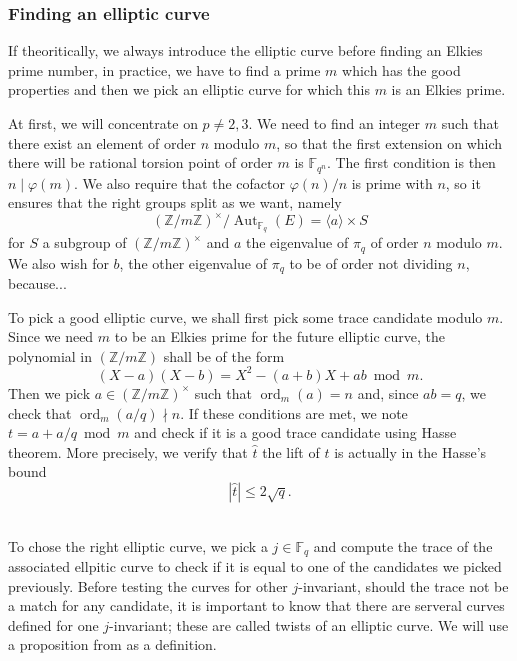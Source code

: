 \documentclass[12pt]{article}
\theoremstyle{plain}
\theoremstyle{definition}
\DeclareMathOperator{\order}{ord} %
\DeclareMathOperator{\Aut}{Aut}
\def\Z{\ensuremath{\mathbb{Z}}}
\def\F{\ensuremath{\mathbb{F}}}
\begin{document}
\subsubsection*{Finding an elliptic curve}
If theoritically, we always introduce the elliptic curve before finding an
Elkies prime number, in practice, we have to find a prime $m$ which has the good
properties and then we pick an elliptic curve for which this $m$ is an Elkies
prime.\par
At first, we will concentrate on $p\neq2,3$. We need to find an integer $m$ 
such that there exist an element of order $n$ modulo $m$, so that the first 
extension on which there will be rational torsion point of order $m$ is 
$\F_{q^n}$. The first condition is then $n\mid \varphi(m)$. We also require 
that the cofactor $\varphi(n)/n$ is prime with $n$, so it ensures that the right 
groups split as we want, namely 
\begin{equation}
(\Z/m\Z)^{\times}/\Aut_{\F_q}(E)=\langle{a}\rangle\times S
\end{equation}
for $S$ a subgroup of $(\Z/m\Z)^{\times}$ and $a$ the eigenvalue of $\pi_q$ of
order $n$ modulo $m$. We also wish for $b$, the other eigenvalue of $\pi_q$ to
be of order not dividing $n$, because...\par
To pick a good elliptic curve, we shall first pick some trace candidate modulo 
$m$. Since we need $m$ to be an Elkies prime for the future elliptic curve, the
polynomial in $(\Z/m\Z)$ shall be of the form
\begin{equation}
(X - a)(X - b) = X^2 - (a + b)X + ab \bmod m.
\end{equation}
Then we pick $a\in(\Z/m\Z)^{\times}$ such that $\order_m(a) = n$ and,
since $ab = q$, we check that $\order_m(a/q)\nmid n$. If these conditions are
met, we note $t = a + a/q \bmod m$ and check if it is a good trace candidate
using Hasse theorem. More precisely, we verify that $\hat{t}$ the lift of $t$ is
actually in the Hasse's bound
\begin{equation}
|\hat{t}| \leq 2\sqrt{q}.
\end{equation}\\\par
To chose the right elliptic curve, we pick a $j\in\F_q$ and compute the trace of
the associated ellpitic curve to check if it is equal to one of the candidates
we picked previously. Before testing the curves for other $j$-invariant, should
the trace not be a match for any candidate, it is important to know that there
are serveral curves defined for one $j$-invariant; these are called twists of an
elliptic curve. We will use a proposition from \cite{Silverman} as a
definition.
\end{document}
